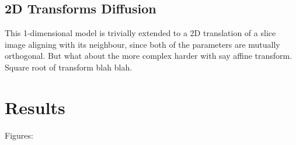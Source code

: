   \subsection{2D Transforms Diffusion} %
  \label{sub:2d_transforms_diffusion}
    This 1-dimensional model is trivially extended to a 2D translation of a slice image aligning with its neighbour, since both of the parameters are mutually orthogonal. But what about the more complex harder with say affine transform. Square root of transform blah blah.
  
  

\section{Results} %
\label{sec:results}
  
  Figures:
  
